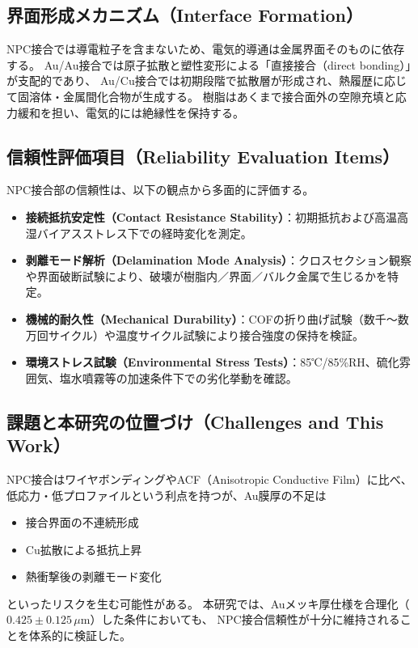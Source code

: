 \documentclass[conference]{IEEEtran}
\begin{document}
\subsection*{界面形成メカニズム（Interface Formation）}
NPC接合では導電粒子を含まないため、電気的導通は金属界面そのものに依存する。
Au/Au接合では原子拡散と塑性変形による「直接接合（direct bonding）」が支配的であり、
Au/Cu接合では初期段階で拡散層が形成され、熱履歴に応じて固溶体・金属間化合物が生成する。
樹脂はあくまで接合面外の空隙充填と応力緩和を担い、電気的には絶縁性を保持する。

\subsection*{信頼性評価項目（Reliability Evaluation Items）}
NPC接合部の信頼性は、以下の観点から多面的に評価する。
\begin{itemize}
  \item \textbf{接続抵抗安定性（Contact Resistance Stability）}：初期抵抗および高温高湿バイアスストレス下での経時変化を測定。
  \item \textbf{剥離モード解析（Delamination Mode Analysis）}：クロスセクション観察や界面破断試験により、破壊が樹脂内／界面／バルク金属で生じるかを特定。
  \item \textbf{機械的耐久性（Mechanical Durability）}：COFの折り曲げ試験（数千～数万回サイクル）や温度サイクル試験により接合強度の保持を検証。
  \item \textbf{環境ストレス試験（Environmental Stress Tests）}：85℃/85\%RH、硫化雰囲気、塩水噴霧等の加速条件下での劣化挙動を確認。
\end{itemize}

\subsection*{課題と本研究の位置づけ（Challenges and This Work）}
NPC接合はワイヤボンディングやACF（Anisotropic Conductive Film）に比べ、
低応力・低プロファイルという利点を持つが、Au膜厚の不足は
\begin{itemize}
  \item 接合界面の不連続形成
  \item Cu拡散による抵抗上昇
  \item 熱衝撃後の剥離モード変化
\end{itemize}
といったリスクを生む可能性がある。
本研究では、Auメッキ厚仕様を合理化（$0.425 \pm 0.125\,\mu$m）した条件においても、
NPC接合信頼性が十分に維持されることを体系的に検証した。
\end{document}
